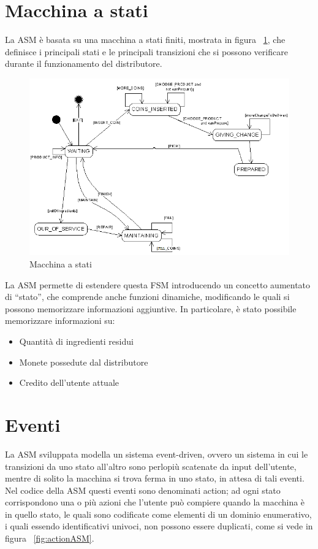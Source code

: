 \section{Macchina a stati}
La ASM è basata su una macchina a stati finiti, mostrata in figura ~\ref{fig:StateMachine}, che definisce i principali stati e le principali transizioni che si possono verificare durante il funzionamento del distributore. 
\begin{figure}[h!]
	\centering
	\includegraphics[width=1\textwidth]{Immagini/FSM.png}
	\caption{Macchina a stati}
	\label{fig:StateMachine}
\end{figure}
La ASM permette di estendere questa FSM introducendo un concetto aumentato di “stato”, che comprende anche funzioni dinamiche, modificando le quali si possono memorizzare informazioni aggiuntive.
In particolare, è stato possibile memorizzare informazioni su:
\begin{itemize}
	\item Quantità di ingredienti residui
	\item Monete possedute dal distributore
	\item Credito dell'utente attuale
\end{itemize}

\newpage
\section{Eventi}
La ASM sviluppata modella un sistema event-driven, ovvero un sistema in cui le transizioni da uno stato all’altro sono perlopiù scatenate da input dell’utente, mentre di solito la macchina si trova ferma in uno stato, in attesa di tali eventi.
Nel codice della ASM questi eventi sono denominati action; ad ogni stato corrispondono una o più azioni che l’utente può compiere quando la macchina è in quello stato, le quali sono codificate come elementi di un dominio enumerativo, i quali essendo identificativi univoci, non possono essere duplicati, come si vede in figura ~\ref{fig:actionASM}.

